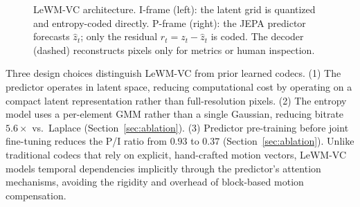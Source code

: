 \documentclass{article}
\begin{document}
\begin{figure}[ht]
  \caption{LeWM-VC architecture. I-frame (left): the latent grid is quantized and entropy-coded directly. P-frame (right): the JEPA predictor forecasts $\hat{z}_t$; only the residual $r_t = z_t - \hat{z}_t$ is coded. The decoder (dashed) reconstructs pixels only for metrics or human inspection.}
  \label{fig:architecture}
\end{figure}

Three design choices distinguish LeWM-VC from prior learned codecs. (1) The predictor operates in latent space, reducing computational cost by operating on a compact latent representation rather than full-resolution pixels. (2) The entropy model uses a per-element GMM rather than a single Gaussian, reducing bitrate $5.6{\times}$ vs.\ Laplace (Section~\ref{sec:ablation}). (3) Predictor pre-training before joint fine-tuning reduces the P/I ratio from $0.93$ to $0.37$ (Section~\ref{sec:ablation}). Unlike traditional codecs that rely on explicit, hand-crafted motion vectors, LeWM-VC models temporal dependencies implicitly through the predictor's attention mechanisms, avoiding the rigidity and overhead of block-based motion compensation.
\end{document}
